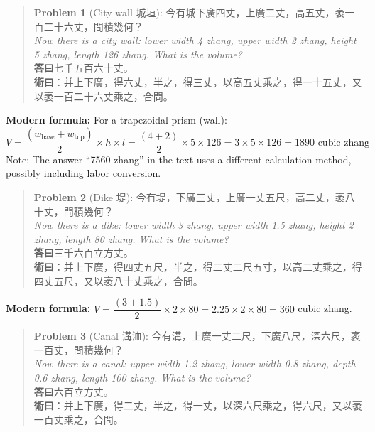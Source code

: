 \documentclass[11pt,a4paper]{article}
\newenvironment{problembox}{%
  \begin{quote}
  \itshape
  \color{problemcolor}
}{%
  \end{quote}
}
\begin{document}
\begin{problembox}
\textbf{Problem 1} (City wall 城垣): 今有城下廣四丈，上廣二丈，高五丈，袤一百二十六丈，問積幾何？\\[0.2cm]
\textit{Now there is a city wall: lower width 4 zhang, upper width 2 zhang, height 5 zhang, length 126 zhang. What is the volume?}\\[0.2cm]
\textbf{答曰}七千五百六十丈。\\[0.2cm]
\textbf{術曰}：并上下廣，得六丈，半之，得三丈，以高五丈乘之，得一十五丈，又以袤一百二十六丈乘之，合問。
\end{problembox}

\textbf{Modern formula:} For a trapezoidal prism (wall):
$$V = \frac{(w_{\text{base}} + w_{\text{top}})}{2} \times h \times l = \frac{(4+2)}{2} \times 5 \times 126 = 3 \times 5 \times 126 = 1890 \text{ cubic zhang}$$
Note: The answer ``7560 zhang'' in the text uses a different calculation method, possibly including labor conversion.

\vspace{0.3cm}

\begin{problembox}
\textbf{Problem 2} (Dike 堤): 今有堤，下廣三丈，上廣一丈五尺，高二丈，袤八十丈，問積幾何？\\[0.2cm]
\textit{Now there is a dike: lower width 3 zhang, upper width 1.5 zhang, height 2 zhang, length 80 zhang. What is the volume?}\\[0.2cm]
\textbf{答曰}三千六百立方丈。\\[0.2cm]
\textbf{術曰}：并上下廣，得四丈五尺，半之，得二丈二尺五寸，以高二丈乘之，得四丈五尺，又以袤八十丈乘之，合問。
\end{problembox}

\textbf{Modern formula:} $V = \dfrac{(3 + 1.5)}{2} \times 2 \times 80 = 2.25 \times 2 \times 80 = 360$ cubic zhang.

\vspace{0.3cm}

\begin{problembox}
\textbf{Problem 3} (Canal 溝洫): 今有溝，上廣一丈二尺，下廣八尺，深六尺，袤一百丈，問積幾何？\\[0.2cm]
\textit{Now there is a canal: upper width 1.2 zhang, lower width 0.8 zhang, depth 0.6 zhang, length 100 zhang. What is the volume?}\\[0.2cm]
\textbf{答曰}六百立方丈。\\[0.2cm]
\textbf{術曰}：并上下廣，得二丈，半之，得一丈，以深六尺乘之，得六尺，又以袤一百丈乘之，合問。
\end{problembox}
\end{document}
